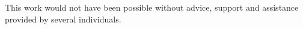 



\begin{Acknowledgments}
\setlength{\baselineskip}{1.5\baselineskip}
{
This work would not have been possible without advice, support and assistance
provided by several individuals.
}
\end{Acknowledgments}
